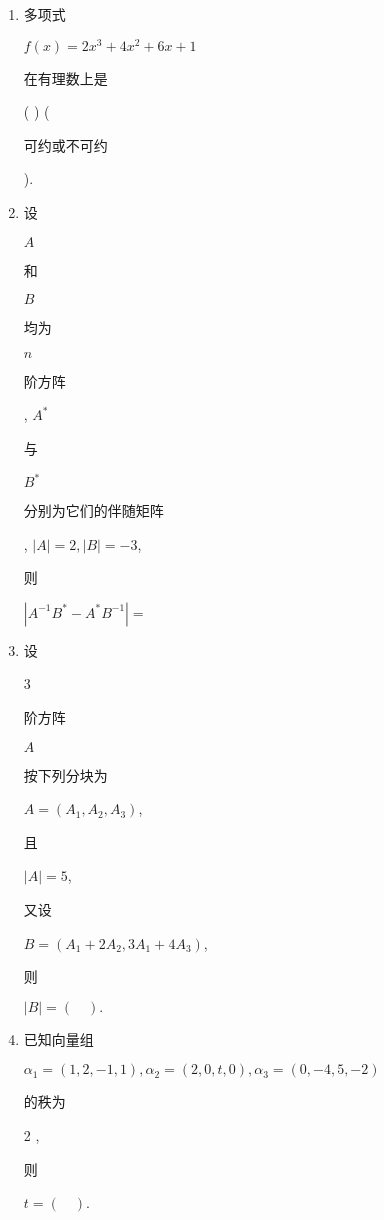 \documentclass[10pt]{article}
\begin{document}
\begin{enumerate}
  \item \begin{CJK}{UTF8}{mj}多项式\end{CJK} $f(x)=2 x^{3}+4 x^{2}+6 x+1$ \begin{CJK}{UTF8}{mj}在有理数上是\end{CJK} ( ) (\begin{CJK}{UTF8}{mj}可约或不可约\end{CJK}).

  \item \begin{CJK}{UTF8}{mj}设\end{CJK} $A$ \begin{CJK}{UTF8}{mj}和\end{CJK} $B$ \begin{CJK}{UTF8}{mj}均为\end{CJK} $n$ \begin{CJK}{UTF8}{mj}阶方阵\end{CJK}, $A^{*}$ \begin{CJK}{UTF8}{mj}与\end{CJK} $B^{*}$ \begin{CJK}{UTF8}{mj}分别为它们的伴随矩阵\end{CJK}, $|A|=2,|B|=-3$, \begin{CJK}{UTF8}{mj}则\end{CJK} $\left|A^{-1} B^{*}-A^{*} B^{-1}\right|=$

  \item \begin{CJK}{UTF8}{mj}设\end{CJK} 3 \begin{CJK}{UTF8}{mj}阶方阵\end{CJK} $A$ \begin{CJK}{UTF8}{mj}按下列分块为\end{CJK} $A=\left(A_{1}, A_{2}, A_{3}\right)$, \begin{CJK}{UTF8}{mj}且\end{CJK} $|A|=5$, \begin{CJK}{UTF8}{mj}又设\end{CJK} $B=\left(A_{1}+2 A_{2}, 3 A_{1}+4 A_{3}\right)$, \begin{CJK}{UTF8}{mj}则\end{CJK} $|B|=(\quad) .$

  \item \begin{CJK}{UTF8}{mj}已知向量组\end{CJK} $\alpha_{1}=(1,2,-1,1), \alpha_{2}=(2,0, t, 0), \alpha_{3}=(0,-4,5,-2)$ \begin{CJK}{UTF8}{mj}的秩为\end{CJK} 2 , \begin{CJK}{UTF8}{mj}则\end{CJK} $t=(\quad)$.


\end{enumerate}
\end{document}
